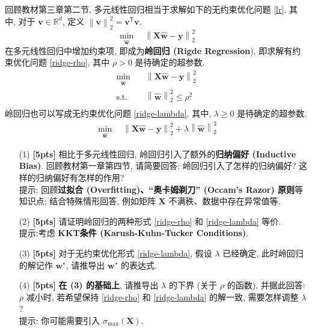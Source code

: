 \documentclass[a4paper]{article}
\numberwithin{equation}{section}
\theoremstyle{definition}
\def \transposed {\mathsf{T}}
\def \Real {\mathbb{R}}
\def \X {\mathbf{X}}
\def \v {\bm{v}}
\def \wh {\hat{\bm{w}}}
\def \ws {\bm{w}^\star}
\def \y {\bm{y}}
\newcommand\norm[1]{\left\| #1 \right\|}
\begin{document}
回顾教材第三章第二节, 多元线性回归相当于求解如下的无约束优化问题 \eqref{lr}. 其中, 对于 $\v \in \Real^d$, 定义 $\norm{\v}_2^2 = \v^\transposed \v$.
\begin{equation}
	\min_{\wh} \quad\norm{\X\wh - \y}_2^2
	\label{lr}
\end{equation}
在多元线性回归中增加约束项, 即成为\textbf{岭回归 (Rigde Regression}), 即求解有约束优化问题 \eqref{ridge-rho}, 其中 $\rho > 0$ 是待确定的超参数.
\begin{equation}
	\begin{aligned}
		\min_{\wh} \quad  & \norm{\X\wh - \y}_2^2           \\
		\text{s.t.} \quad & \norm{\wh}_2^2 \leqslant \rho^2 \\
	\end{aligned}
	\label{ridge-rho}
\end{equation}
岭回归也可以写成无约束优化问题 \eqref{ridge-lambda}. 其中, $\lambda \geq 0$ 是待确定的超参数.
\begin{equation}
	\begin{aligned}
		\min_{\wh} \quad\norm{\X\wh - \y}_2^2 + \lambda \norm{\wh}_2^2
	\end{aligned}
	\label{ridge-lambda}
\end{equation}

\begin{itemize}
	\item[(1)] \textbf{[5pts]} 相比于多元线性回归, 岭回归引入了额外的\textbf{归纳偏好 (Inductive Bias)}. 回顾教材第一章第四节, 请简要回答: 岭回归引入了怎样的归纳偏好? 这样的归纳偏好有怎样的作用? \\
	      提示: 回顾\textbf{过拟合 (Overfitting)、``奥卡姆剃刀'' (Occam's Razor) 原则}等知识点; 结合特殊情形回答, 例如矩阵 $\X$ 不满秩、数据中存在异常值等.
	\item[(2)] \textbf{[5pts]} 请证明岭回归的两种形式 \eqref{ridge-rho} 和 \eqref{ridge-lambda} 等价. \\
	      提示:考虑 \textbf{KKT条件 (Karush-Kuhn-Tucker Conditions)}.
	\item[(3)] \textbf{[5pts]} 对于无约束优化形式 \eqref{ridge-lambda}, 假设 $\lambda$ 已经确定, 此时岭回归的解记作 $\ws$, 请推导出 $\ws$ 的表达式.
	\item[(4)] \textbf{[5pts]} \textbf{在 (3) 的基础上}, 请推导出 $\lambda$ 的下界 (关于 $\rho$ 的函数), 并据此回答: $\rho$ 减小时, 若希望保持 \eqref{ridge-rho} 和 \eqref{ridge-lambda} 的解一致, 需要怎样调整 $\lambda$? \\
	      提示: 你可能需要引入 $\sigma_{\max}(\X)$.
\end{itemize}
\end{document}
